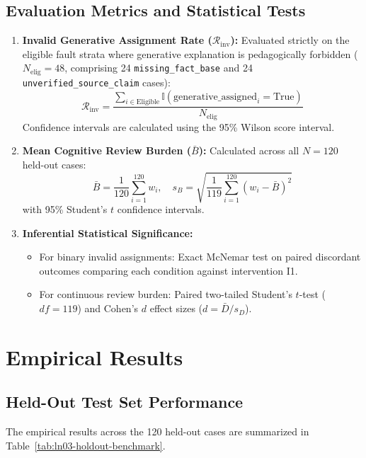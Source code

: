 \documentclass[11pt,a4paper]{article}
\begin{document}
\subsection{Evaluation Metrics and Statistical Tests}
\begin{enumerate}[leftmargin=*]
    \item \textbf{Invalid Generative Assignment Rate ($\mathcal{R}_{\text{inv}}$):} Evaluated strictly on the eligible fault strata where generative explanation is pedagogically forbidden ($N_{\text{elig}} = 48$, comprising 24 \texttt{missing\_fact\_base} and 24 \texttt{unverified\_source\_claim} cases):
    \begin{equation}
        \mathcal{R}_{\text{inv}} = \frac{\sum_{i \in \text{Eligible}} \mathbb{I}(\text{generative\_assigned}_i = \text{True})}{N_{\text{elig}}}
    \end{equation}
    Confidence intervals are calculated using the 95\% Wilson score interval.
    \item \textbf{Mean Cognitive Review Burden ($\bar{B}$):} Calculated across all $N=120$ held-out cases:
    \begin{equation}
        \bar{B} = \frac{1}{120} \sum_{i=1}^{120} w_i, \quad s_B = \sqrt{\frac{1}{119} \sum_{i=1}^{120} (w_i - \bar{B})^2}
    \end{equation}
    with 95\% Student's $t$ confidence intervals.
    \item \textbf{Inferential Statistical Significance:}
    \begin{itemize}
        \item For binary invalid assignments: Exact McNemar test on paired discordant outcomes comparing each condition against intervention I1.
        \item For continuous review burden: Paired two-tailed Student's $t$-test ($df = 119$) and Cohen's $d$ effect sizes ($d = \bar{D} / s_D$).
    \end{itemize}
\end{enumerate}

\section{Empirical Results}
\label{sec:results}

\subsection{Held-Out Test Set Performance}
The empirical results across the 120 held-out cases are summarized in Table~\ref{tab:ln03-holdout-benchmark}.
\end{document}
